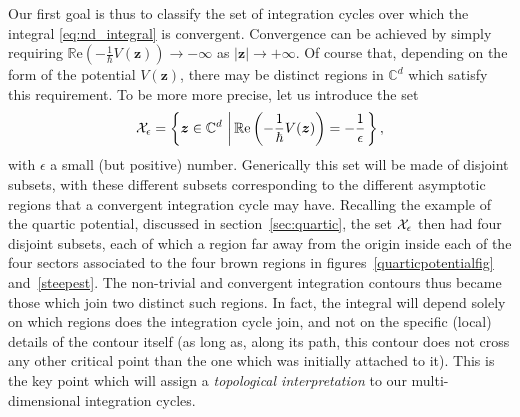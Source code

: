 \documentclass[11pt,a4paper]{article}
\newcommand{\CX}{{\cal X}}
\def\BC{{\mathbb C}}
\newcommand{\be}{\begin{equation}}
\newcommand{\ee}{\end{equation}}
\def\re{{\mathbb{R}}{\mathrm{e}}}
\begin{document}
Our first goal is thus to classify the set of integration cycles over which the integral \eqref{eq:nd_integral} is convergent. Convergence can be achieved by simply requiring $\re \left( - \frac{1}{\hbar} V(\boldsymbol{z}) \right) \rightarrow -\infty$ as $|\boldsymbol{z}| \rightarrow +\infty$. Of course that, depending on the form of the potential $V(\boldsymbol{z})$, there may be distinct regions in $\BC^d$ which satisfy this requirement. To be more more precise, let us introduce the set
%
\be
\label{eq:chi}
\CX_{\epsilon} = \left\{ \boldsymbol{z} \in \BC^d\, \left|\, \re \left( - \frac{1}{\hbar} V (\boldsymbol{z}) \right) = - \frac{1}{\epsilon} \right. \right\},
\ee
%
\noindent
with $\epsilon$ a small (but positive) number. Generically this set will be made of disjoint subsets, with these different subsets corresponding to the different asymptotic regions that a convergent integration cycle may have. Recalling the example of the quartic potential, discussed in section~\ref{sec:quartic}, the set $\CX_\epsilon$ then had four disjoint subsets, each of which a region far away from the origin inside each of the four sectors associated to the four brown regions in figures~\ref{quarticpotentialfig} and~\ref{steepest}. The non-trivial and convergent integration contours thus became those which join two distinct such regions. In fact, the integral will depend solely on which regions does the integration cycle join, and not on the specific (local) details of the contour itself (as long as, along its path, this contour does not cross any other critical point than the one which was initially attached to it). This is the key point which will assign a \textit{topological interpretation} to our multi-dimensional integration cycles. 
\end{document}
